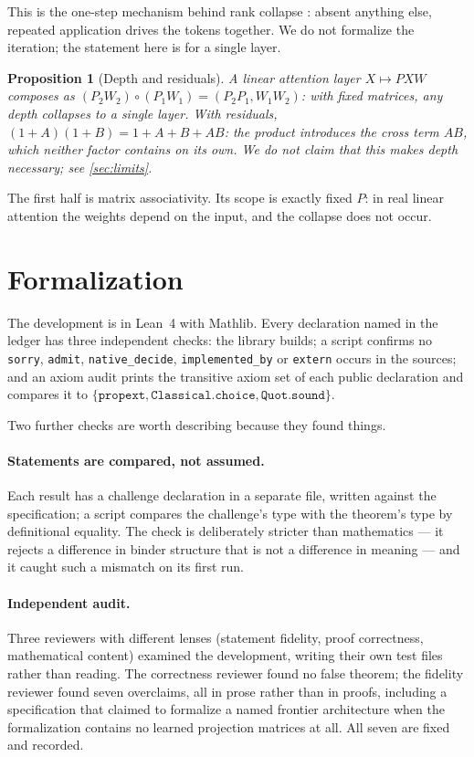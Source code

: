\documentclass[11pt]{article}
\newtheorem{proposition}[theorem]{Proposition}
\newcommand{\Lean}{Lean}
\newcommand{\code}[1]{\texttt{#1}}
\begin{document}
This is the one-step mechanism behind rank collapse \cite{dong}: absent
anything else, repeated application drives the tokens together. We do not
formalize the iteration; the statement here is for a single layer.

\begin{proposition}[Depth and residuals]\label{prop:depth}
A linear attention layer $X \mapsto P X W$ composes as
$(P_2 W_2)\circ(P_1 W_1) = (P_2 P_1, W_1 W_2)$: with fixed matrices, any depth
collapses to a single layer. With residuals,
$(1+A)(1+B) = 1 + A + B + AB$: the product introduces the cross term $AB$, which
neither factor contains on its own. We do not claim that this makes depth
necessary; see \cref{sec:limits}.
\end{proposition}

The first half is matrix associativity. Its scope is exactly fixed $P$: in real
linear attention the weights depend on the input, and the collapse does not
occur.

\section{Formalization}\label{sec:formal}

The development is in \Lean{}~4 with Mathlib. Every declaration named in the
ledger has three independent checks: the library builds; a script confirms no
\code{sorry}, \code{admit}, \code{native\_decide}, \code{implemented\_by} or
\code{extern} occurs in the sources; and an axiom audit prints the transitive
axiom set of each public declaration and compares it to $\{\code{propext},
\code{Classical.choice}, \code{Quot.sound}\}$.

Two further checks are worth describing because they found things.

\paragraph{Statements are compared, not assumed.} Each result has a challenge
declaration in a separate file, written against the specification; a script
compares the challenge's type with the theorem's type by definitional equality.
The check is deliberately stricter than mathematics --- it rejects a difference
in binder structure that is not a difference in meaning --- and it caught such a
mismatch on its first run.

\paragraph{Independent audit.} Three reviewers with different lenses (statement
fidelity, proof correctness, mathematical content) examined the development,
writing their own test files rather than reading. The correctness reviewer found
no false theorem; the fidelity reviewer found seven overclaims, all in prose
rather than in proofs, including a specification that claimed to formalize a
named frontier architecture when the formalization contains no learned
projection matrices at all. All seven are fixed and recorded.
\end{document}
